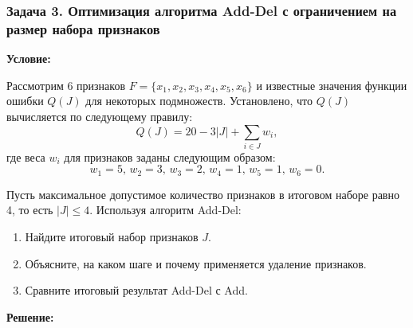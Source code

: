 \bigskip

\subsubsection*{Задача 3. Оптимизация алгоритма Add-Del с ограничением на размер набора признаков}

\textbf{Условие:}

Рассмотрим 6 признаков $F = \{x_1, x_2, x_3, x_4, x_5, x_6\}$ и известные значения функции ошибки $Q(J)$ для некоторых подмножеств. Установлено, что $Q(J)$ вычисляется по следующему правилу:
\[
Q(J) = 20 - 3|J| + \sum_{i \in J} w_i,
\]
где веса $w_i$ для признаков заданы следующим образом:
\[
w_1 = 5, \, w_2 = 3, \, w_3 = 2, \, w_4 = 1, \, w_5 = 1, \, w_6 = 0.
\]

Пусть максимальное допустимое количество признаков в итоговом наборе равно 4, то есть $|J| \leq 4$. Используя алгоритм Add-Del:
\begin{enumerate}
    \item Найдите итоговый набор признаков $J$.
    \item Объясните, на каком шаге и почему применяется удаление признаков.
    \item Сравните итоговый результат Add-Del с Add.
\end{enumerate}

\textbf{Решение:}

